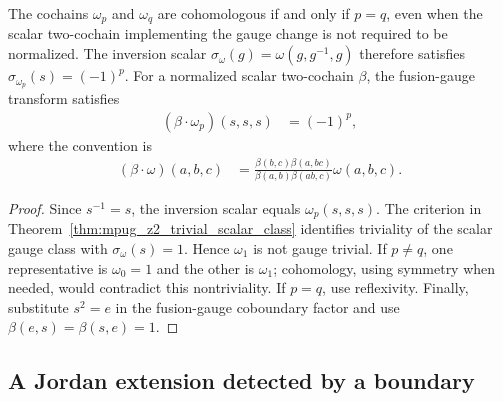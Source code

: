 \begin{theorem}
    \label{thm:asymex_z2_classes}
    \leanok
    The cochains $\omega_p$ and $\omega_q$ are cohomologous if and
    only if $p=q$, even when the scalar two-cochain implementing the
    gauge change is not required to be normalized.
    The inversion scalar $\sigma_\omega(g)=\omega(g,g^{-1},g)$
    therefore satisfies $\sigma_{\omega_p}(s)=(-1)^p$.
    For a normalized scalar two-cochain $\beta$, the fusion-gauge
    transform satisfies
    \begin{align}
        (\beta\cdot\omega_p)(s,s,s) & =(-1)^p,
    \end{align}
    where the convention is
    \begin{align}
        (\beta\cdot\omega)(a,b,c)
         & =\frac{\beta(b,c)\beta(a,bc)}
        {\beta(a,b)\beta(ab,c)}\omega(a,b,c).
    \end{align}
\end{theorem}
\begin{proof}
    \leanok
    Since $s^{-1}=s$, the inversion scalar equals
    $\omega_p(s,s,s)$. The criterion in Theorem~\ref{thm:mpug_z2_trivial_scalar_class}
    identifies triviality of the scalar gauge
    class with $\sigma_\omega(s)=1$. Hence $\omega_1$ is not
    gauge trivial. If $p\neq q$, one representative is $\omega_0=1$
    and the other is $\omega_1$; cohomology, using symmetry when
    needed, would contradict this nontriviality.
    If $p=q$, use reflexivity.
    Finally, substitute $s^2=e$ in the fusion-gauge coboundary
    factor and use $\beta(e,s)=\beta(s,e)=1$.
\end{proof}

\subsection{A Jordan extension detected by a boundary}

